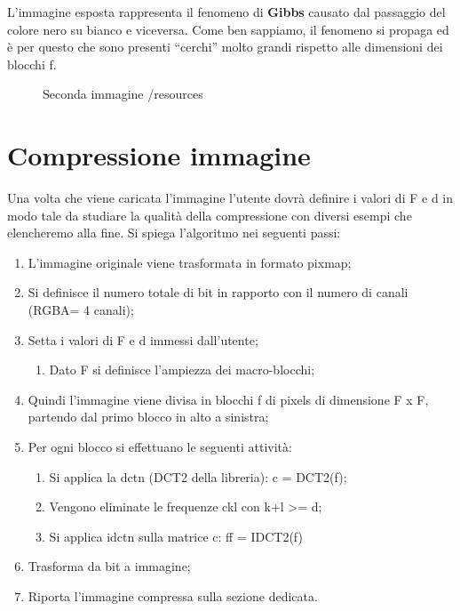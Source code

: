 \documentclass[12pt]{article}
\begin{document}
L’immagine esposta rappresenta il fenomeno di \textbf{Gibbs} causato dal passaggio del colore nero su bianco e viceversa. Come ben sappiamo, il fenomeno si propaga ed è per questo che sono presenti “cerchi” molto grandi rispetto alle dimensioni dei blocchi f. 
\begin{figure}[H]
    \caption{Seconda immagine /resources}
    \label{fig: Figura con f = 30 e d = 58}
\end{figure}


\section{Compressione immagine}
	Una volta che viene caricata l’immagine l’utente dovrà definire i valori di F e d in modo tale da studiare la qualità della compressione con diversi esempi che elencheremo alla fine.\newline
	Si spiega l’algoritmo nei seguenti passi:
	\begin{enumerate}
			\item L’immagine originale viene trasformata in formato pixmap;
			\item Si definisce il numero totale di bit in rapporto con il numero di canali (RGBA= 4 canali);
			\item Setta i valori di F e d immessi dall’utente;
				\begin{enumerate}[label=\Alph*]
					\item Dato F si definisce l’ampiezza dei macro-blocchi;
				\end{enumerate}
			\item Quindi l’immagine viene divisa in blocchi f di pixels di dimensione F x F, partendo dal primo blocco in alto a sinistra;
			\item Per ogni blocco si effettuano le seguenti attività:
				\begin{enumerate}[label=\Alph*]
					\item Si applica la dctn (DCT2 della libreria): c = DCT2(f);
					\item Vengono eliminate le frequenze ckl con k+l >= d;	
					\item Si applica idctn sulla matrice c: ff = IDCT2(f)	
				\end{enumerate}
			\item Trasforma da bit a immagine;
			\item Riporta l’immagine compressa sulla sezione dedicata.
	\end{enumerate}
\end{document}
